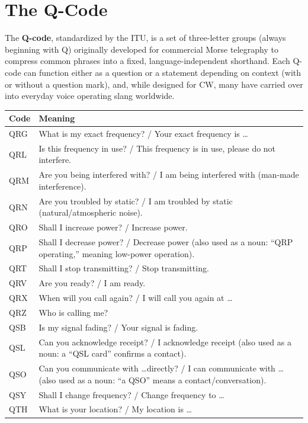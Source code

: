 \section{The Q-Code}

The \textbf{Q-code}, standardized by the ITU, is a set of
three-letter groups (always beginning with Q) originally developed for
commercial Morse telegraphy to compress common phrases into a fixed,
language-independent shorthand. Each Q-code can function either as a
question or a statement depending on context (with or without a
question mark), and, while designed for CW, many have carried over into
everyday voice operating slang worldwide.

\begin{center}
\renewcommand{\arraystretch}{1.05}
\begin{tabular}{@{}lp{9.5cm}@{}}
\toprule
Code & Meaning \\
\midrule
QRG & What is my exact frequency? / Your exact frequency is \dots \\
QRL & Is this frequency in use? / This frequency is in use, please
do not interfere. \\
QRM & Are you being interfered with? / I am being interfered with
(man-made interference). \\
QRN & Are you troubled by static? / I am troubled by static
(natural/atmospheric noise). \\
QRO & Shall I increase power? / Increase power. \\
QRP & Shall I decrease power? / Decrease power (also used as a noun:
``QRP operating,'' meaning low-power operation). \\
QRT & Shall I stop transmitting? / Stop transmitting. \\
QRV & Are you ready? / I am ready. \\
QRX & When will you call again? / I will call you again at \dots \\
QRZ & Who is calling me? \\
QSB & Is my signal fading? / Your signal is fading. \\
QSL & Can you acknowledge receipt? / I acknowledge receipt (also
used as a noun: a ``QSL card'' confirms a contact). \\
QSO & Can you communicate with \dots directly? / I can communicate
with \dots (also used as a noun: ``a QSO'' means a contact/conversation). \\
QSY & Shall I change frequency? / Change frequency to \dots \\
QTH & What is your location? / My location is \dots \\
\bottomrule
\end{tabular}
\end{center}


